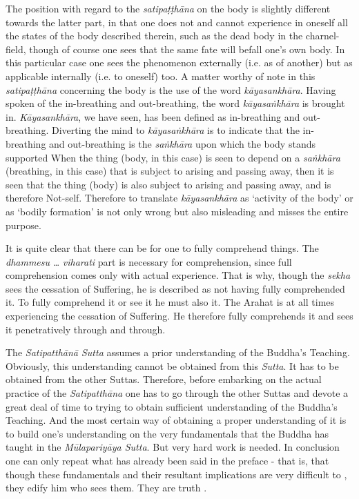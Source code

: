 The position with regard to the \emph{satipaṭṭhāna} on the body is slightly different towards the latter part, in that one does not and cannot experience in oneself all the states of the body described therein, such as the dead body in the charnel-field, though of course one sees that the same fate will befall one's own body. In this particular case one sees the phenomenon externally (i.e. as of another) but as applicable internally (i.e. to oneself) too. A matter worthy of note in this \emph{satipaṭṭhāna} concerning the body is the use of the word \emph{kāyasankhāra}. Having spoken of the in-breathing and out-breathing, the word \emph{kāyasaṅkhāra} is brought in. \emph{Kāyasankhāra}, we have seen, has been defined as in-breathing and out-breathing. Diverting the mind to \emph{kāyasaṅkhāra} is to indicate that the in-breathing and out-breathing is the \emph{saṅkhāra} upon which the body stands supported When the thing (body, in this case) is seen to depend on a \emph{saṅkhāra} (breathing, in this case) that is subject to arising and passing away, then it is seen that the thing (body) is also subject to arising and passing away, and is therefore Not-self. Therefore to translate \emph{kāyasankhāra} as `activity of the body' or as `bodily formation' is not only wrong but also misleading and misses the entire purpose.

It is quite clear that there can be  for one to fully comprehend things. The \emph{dhammesu} \ldots\hspace{0pt} \emph{viharati} part is necessary for  comprehension, since full comprehension comes only with actual experience. That is why, though the \emph{sekha} sees the cessation of Suffering, he is described as not having fully comprehended it. To fully comprehend it or  see it  he must also  it. The Arahat is at all times experiencing the cessation of Suffering. He therefore fully comprehends it and sees it penetratively through and through.

\protect\hypertarget{truth-for-him}{}{}The \emph{Satipatthānā Sutta} assumes a prior understanding of the Buddha's Teaching. Obviously, this understanding cannot be obtained from this \emph{Sutta}. It has to be obtained from the other Suttas. Therefore, before embarking on the actual practice of the \emph{Satipatthāna} one has to go through the other Suttas and devote a great deal of time to trying to obtain sufficient understanding of the Buddha's Teaching. And the most certain way of obtaining a proper understanding of it is to build one's understanding on the very fundamentals that the Buddha has taught in the \emph{Mūlapariyāya Sutta}. But very hard work is needed. In conclusion one can only repeat what has already been said in the preface - that is, that though these fundamentals and their resultant implications are very difficult to , they edify him who sees them. They are truth .
